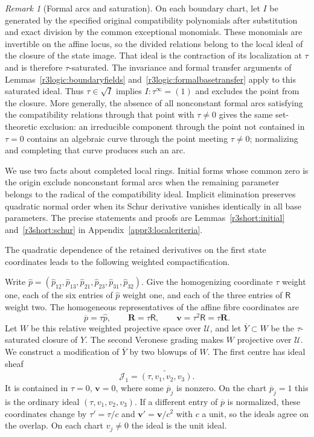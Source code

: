 \documentclass[11pt,a4paper]{article}
\numberwithin{equation}{section}
\theoremstyle{plain}
\theoremstyle{definition}
\theoremstyle{remark}
\newtheorem{remark}[theorem]{Remark}
\begin{document}
\begin{remark}[Formal arcs and saturation]
On each boundary chart, let $I$ be generated by the specified original
compatibility polynomials after substitution and exact division by the common
exceptional monomials. These monomials are invertible on the affine locus,
so the divided relations belong to the local ideal of the closure of the state image.
That ideal is the contraction of its localization at $\tau$ and is
therefore $\tau$-saturated. The invariance and formal transfer arguments
of Lemmas~\ref{r3logic:boundaryfields} and~\ref{r3logic:formalbasetransfer}
apply to this saturated ideal. Thus $\tau\in\sqrt I$ implies
$I:\tau^\infty=(1)$ and excludes the point from the closure. More generally, the
absence of all nonconstant formal arcs satisfying the compatibility relations through that point
with $\tau\ne0$ gives the same set-theoretic exclusion: an
irreducible component through the point not contained in $\tau=0$
contains an algebraic curve through the point meeting $\tau\ne0$;
normalizing and completing that curve produces such an arc.
\end{remark}

We use two facts about completed local rings. Initial forms whose common zero is the origin exclude
nonconstant formal arcs when the remaining parameter belongs to the
radical of the compatibility ideal. Implicit elimination preserves quadratic
normal order when its Schur derivative vanishes identically in all
base parameters. The precise statements and proofs are
Lemmas~\ref{r3short:initial} and~\ref{r3short:schur} in
Appendix~\ref{appr3:localcriteria}.

The quadratic dependence of the retained derivatives on the first
state coordinates leads to the following weighted compactification.

Write $\widehat p=(\widehat p_{12},\widehat p_{13},\widehat p_{21},\widehat p_{23},\widehat p_{31},\widehat p_{32})$.
Give the homogenizing coordinate $\tau$ weight one, each of the six
entries of $\widehat p$ weight one, and each of the three entries of $\mathsf R$
weight two. The homogeneous representatives of the affine fibre coordinates are
\[
 \overline p=\tau\widehat p,\qquad
 \boldsymbol R=\tau\mathsf R,\qquad
 \boldsymbol v=\tau^2\mathsf R=\tau\boldsymbol R.
\]
Let $W$ be this relative weighted projective space over $\mathscr U$,
and let $\overline Y\subset W$ be the $\tau$-saturated closure of $Y$.
The second Veronese grading makes $W$ projective over $\mathscr U$.
We construct a modification of $\overline Y$ by two blowups of $W$.
The first centre has ideal sheaf
\[
 \mathcal J_1=\widetilde{(\tau,v_1,v_2,v_3)}.
\]
It is contained in $\tau=0$, $\boldsymbol v=0$, where some
$\overline p_j$ is nonzero. On the chart $\overline p_j=1$ this
is the ordinary ideal $(\tau,v_1,v_2,v_3)$.
If a different entry of $\overline p$ is normalized, these coordinates
change by $\tau'=\tau/c$ and $\boldsymbol v'=\boldsymbol v/c^2$
with $c$ a unit, so the ideals agree on the overlap.
On each chart $v_j\ne0$ the ideal is the unit ideal.
\end{document}
